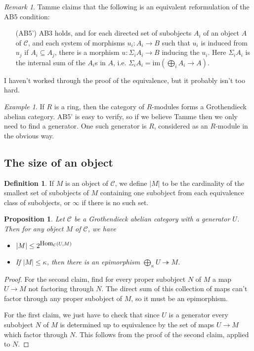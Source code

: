 \documentclass[letterpaper,11pt]{article}
\newtheorem{prop}{Proposition}
\theoremstyle{definition}
\newtheorem{defn}{Definition}
\theoremstyle{remark}
\newtheorem{ex}{Example}
\newtheorem{rmk}{Remark}
\begin{document}
\begin{rmk} Tamme \cite{etale} claims that the following is an equivalent reformulation of the AB5 condition:
\begin{itemize}
\item[(AB5')] AB3 holds, and for each directed set of subobjects $A_i$ of an object $A$ of $\mathcal{C}$, and each system of morphisms $u_i:A_i\rightarrow B$ such that $u_i$ is induced from $u_j$ if $A_i \subseteq A_j$, there is a morphism $u:\Sigma_i A_i \rightarrow B$ inducing the $u_i$. Here $\Sigma_i A_i$ is the internal sum of the $A_i$s in $A$, i.e. $\Sigma_i A_i = \mbox{im}(\bigoplus_i A_i \rightarrow A)$.
\end{itemize}
I haven't worked through the proof of the equivalence, but it probably isn't too hard.
\end{rmk}

\begin{ex} If $R$ is a ring, then the category of $R$-modules forms a Grothendieck abelian category. AB5' is easy to verify, so if we believe Tamme then we only need to find a generator. One such generator is $R$, considered as an $R$-module in the obvious way.
\end{ex}

\subsection{The size of an object}
\begin{defn} If $M$ is an object of $\mathcal{C}$, we define $|M|$ to be the cardinality of the smallest set of subobjects of $M$ containing one subobject from each equivalence class of subobjects, or $\infty$ if there is no such set.
\end{defn}

\begin{prop} Let $\mathcal{C}$ be a Grothendieck abelian category with a generator $U$. Then for any object $M$ of $\mathcal{C}$, we have
\begin{itemize}
\item $|M| \le 2^{\mbox{\rm \small Hom}_{\mathcal{C}}(U,M)}$

\item If $|M| \le \kappa$, then there is an epimorphism $\bigoplus_\kappa U \twoheadrightarrow M$.
\end{itemize}
\end{prop}
\begin{proof} For the second claim, find for every proper subobject $N$ of $M$ a map $U\rightarrow M$ not factoring through $N$. The direct sum of this collection of maps can't factor through any proper subobject of $M$, so it must be an epimorphism.

For the first claim, we just have to check that since $U$ is a generator every subobject $N$ of $M$ is determined up to equivalence by the set of maps $U\rightarrow M$ which factor through $N$. This follows from the proof of the second claim, applied to $N$.
\end{proof}
\end{document}

